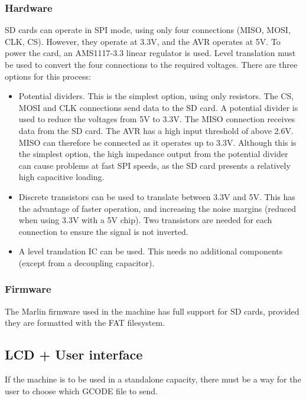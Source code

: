 \subsubsection {Hardware}
SD cards can operate in SPI mode, using only four connections (MISO, MOSI, CLK, CS). However, they operate at 3.3V, and the AVR operates at 5V. To power the card, an AMS1117-3.3 linear regulator
is used. Level translation must be used to convert the four connections to the required voltages. There are three options for this process:

\begin{itemize} \itemsep0em
	\item	Potential dividers. This is the simplest option, using only resistors. The CS, MOSI and CLK connections send data to the SD card. A potential divider is used to reduce the voltages
			from 5V to 3.3V. The MISO connection receives data from the SD card. The AVR has a high input threshold of above 2.6V. MISO can therefore be connected as it operates up to 3.3V. 
			Although this is the simplest option, the high impedance output from the potential divider can cause problems at fast SPI speeds, as the SD card presents a relatively high
			capacitive loading.
	\item	Discrete transistors can be used to translate between 3.3V and 5V. This has the advantage of faster operation, and increasing the noise margins (reduced when using 3.3V with a 5V chip).
			Two transistors are needed for each connection to ensure the signal is not inverted.
	\item	A level translation IC can be used. This needs no additional components (except from a decoupling capacitor).
\end{itemize}

\subsubsection {Firmware}
The Marlin firmware used in the machine has full support for SD cards, provided they are formatted with the FAT filesystem.

\subsection{LCD + User interface}
If the machine is to be used in a standalone capacity, there must be a way for the user to choose which GCODE file to send.

